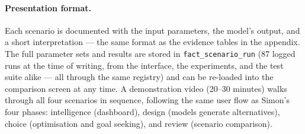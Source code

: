 \paragraph{Presentation format.}
Each scenario is documented with the input parameters, the model's output, and a short interpretation --- the same format as the evidence tables in the appendix. The full parameter sets and results are stored in \texttt{fact\_scenario\_run} (87 logged runs at the time of writing, from the interface, the experiments, and the test suite alike --- all through the same registry) and can be re-loaded into the comparison screen at any time. A demonstration video (20--30 minutes) walks through all four scenarios in sequence, following the same user flow as Simon's four phases: intelligence (dashboard), design (models generate alternatives), choice (optimisation and goal seeking), and review (scenario comparison).
